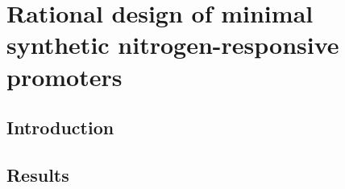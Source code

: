 \documentclass[../main.tex]{subfiles}
\begin{document}
\chapter{Rational design of minimal synthetic nitrogen-responsive promoters}
\label{chapter5}
\section{Introduction}
\label{chapter5:introduction}

\section{Results}
\label{chapter5:results}
\end{document}
